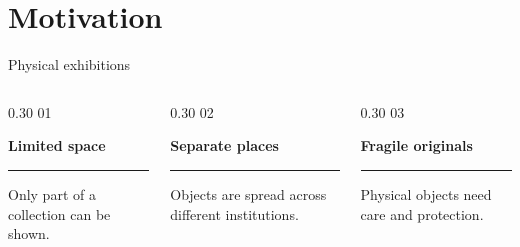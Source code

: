 \section{Motivation}
\begin{frame}[c]{Physical exhibitions}
\begin{columns}[T,onlytextwidth]
\begin{column}{0.30\textwidth}
\textcolor{unired}{\LARGE 01}

\vspace{0.15cm}
\large\textbf{Limited space}
\textcolor{unimint}{\rule{\linewidth}{1.6pt}}

\small Only part of a collection can be shown.
\end{column}
\begin{column}{0.30\textwidth}
\textcolor{unired}{\LARGE 02}

\vspace{0.15cm}
\large\textbf{Separate places}
\textcolor{unimint}{\rule{\linewidth}{1.6pt}}

\small Objects are spread across different institutions.
\end{column}
\begin{column}{0.30\textwidth}
\textcolor{unired}{\LARGE 03}

\vspace{0.15cm}
\large\textbf{Fragile originals}
\textcolor{unimint}{\rule{\linewidth}{1.6pt}}

\small Physical objects need care and protection.
\end{column}
\end{columns}
\end{frame}
